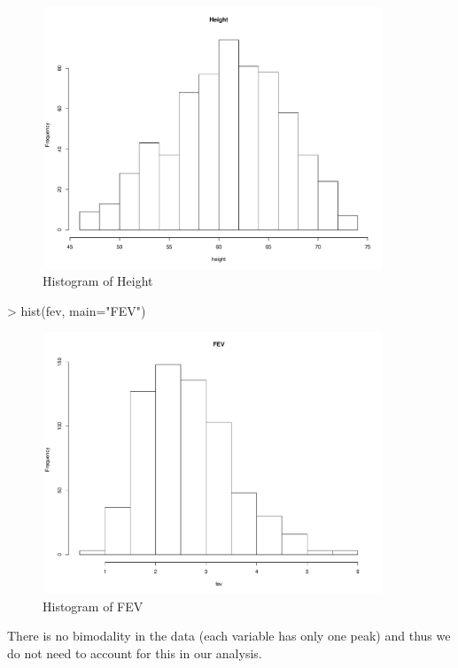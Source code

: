 \documentclass[landscape]{article}
\renewenvironment{Schunk}{\vspace{\topsep}}{\vspace{\topsep}}
\begin{document}
\begin{figure}[h]
\centering
\includegraphics[width=4in, height=3.08in]{fevdoc-heighthist}
\caption{Histogram of Height}
\label{heighthist}
\end{figure}
\clearpage
\begin{Schunk}
\begin{Sinput}
> hist(fev, main="FEV")
\end{Sinput}
\end{Schunk}
\begin{figure}[h]
\centering
\includegraphics[width=4in, height=3.08in]{fevdoc-fevhist}
\caption{Histogram of FEV}
\label{fevhist}
\end{figure}
There is no bimodality in the data (each variable has only one peak) and thus we do not need to account for this in our analysis.
\clearpage
\end{document}
